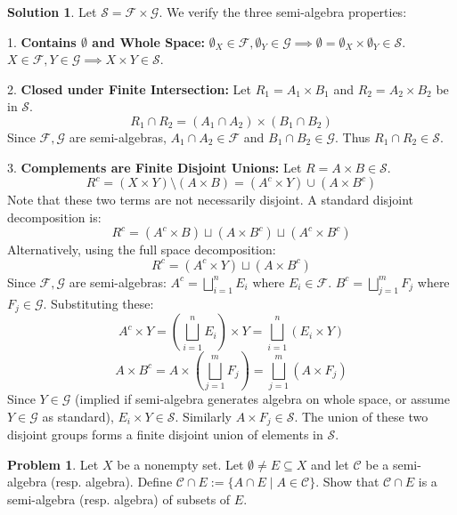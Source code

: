 \documentclass[11pt]{article}
\theoremstyle{definition}
\newtheorem{problem}{Problem}
\newtheorem*{solution}{Solution}
\newcommand{\C}{\mathcal{C}}
\newcommand{\F}{\mathcal{F}}
\newcommand{\G}{\mathcal{G}}
\renewcommand{\S}{\mathcal{S}}
\begin{document}
\begin{solution}
Let $\S = \F \times \G$. We verify the three semi-algebra properties:

1. \textbf{Contains $\emptyset$ and Whole Space:}
   $\emptyset_X \in \F, \emptyset_Y \in \G \implies \emptyset = \emptyset_X \times \emptyset_Y \in \S$.
   $X \in \F, Y \in \G \implies X \times Y \in \S$.

2. \textbf{Closed under Finite Intersection:}
   Let $R_1 = A_1 \times B_1$ and $R_2 = A_2 \times B_2$ be in $\S$.
   \[ R_1 \cap R_2 = (A_1 \cap A_2) \times (B_1 \cap B_2) \]
   Since $\F, \G$ are semi-algebras, $A_1 \cap A_2 \in \F$ and $B_1 \cap B_2 \in \G$. Thus $R_1 \cap R_2 \in \S$.

3. \textbf{Complements are Finite Disjoint Unions:}
   Let $R = A \times B \in \S$.
   \[ R^c = (X \times Y) \setminus (A \times B) = (A^c \times Y) \cup (A \times B^c) \]
   Note that these two terms are not necessarily disjoint. A standard disjoint decomposition is:
   \[ R^c = (A^c \times B) \sqcup (A \times B^c) \sqcup (A^c \times B^c) \]
   Alternatively, using the full space decomposition:
   \[ R^c = (A^c \times Y) \sqcup (A \times B^c) \]
   Since $\F, \G$ are semi-algebras:
   $A^c = \bigsqcup_{i=1}^n E_i$ where $E_i \in \F$.
   $B^c = \bigsqcup_{j=1}^m F_j$ where $F_j \in \G$.
   Substituting these:
   \[ A^c \times Y = \left(\bigsqcup_{i=1}^n E_i\right) \times Y = \bigsqcup_{i=1}^n (E_i \times Y) \]
   \[ A \times B^c = A \times \left(\bigsqcup_{j=1}^m F_j\right) = \bigsqcup_{j=1}^m (A \times F_j) \]
   Since $Y \in \G$ (implied if semi-algebra generates algebra on whole space, or assume $Y \in \G$ as standard), $E_i \times Y \in \S$. Similarly $A \times F_j \in \S$.
   The union of these two disjoint groups forms a finite disjoint union of elements in $\S$.
\end{solution}

\hrulefill

\begin{problem}
Let $X$ be a nonempty set. Let $\emptyset \neq E \subseteq X$ and let $\C$ be a semi-algebra (resp. algebra). Define $\C \cap E := \{A \cap E \mid A \in \C\}$. Show that $\C \cap E$ is a semi-algebra (resp. algebra) of subsets of $E$.
\end{problem}
\end{document}
